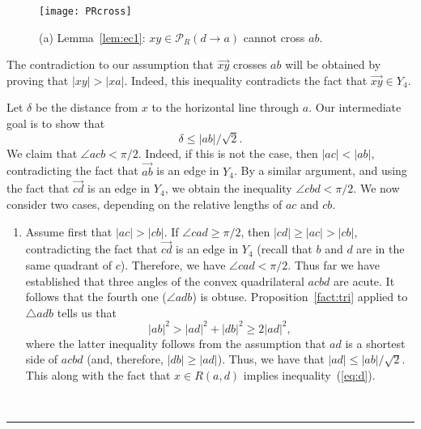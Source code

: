 \pdfoutput=1  \documentclass[11pt]{article}
\newcommand{\qed}{\rule{0.5em}{1.5ex}}
\newcommand{\fqed}{{\hfill~\qed}}
\newenvironment{proof}{{\noindent \bf Proof.}}
                      {{\hfill \fqed} \vspace{1em}}
\newcommand{\Pa}{{\mathcal P}}
\begin{document}
\begin{proof}
\begin{figure}[htbp]
\centering
\texttt{[image: PRcross]}
\caption{(a) Lemma~\ref{lem:ec1}: $xy \in \Pa_R(d \rightarrow a)$ cannot cross $ab$.}
\label{fig:PRcross}
\end{figure}


The contradiction to our assumption that $\overrightarrow{xy}$ crosses $ab$
will be obtained by proving that $|xy| > |xa|$. Indeed, this inequality
contradicts the fact that $\overrightarrow{xy} \in Y_4$.

Let $\delta$ be the distance from $x$ to the horizontal line through $a$.
Our intermediate goal is to show that
\begin{equation}
\delta \le |ab|/\sqrt{2} .
\label{eq:d}
\end{equation}
We claim that $\angle{acb} < \pi/2$. Indeed, if this is not the case,
then $|ac|<|ab|$, contradicting the fact that $\overrightarrow{ab}$ is an
edge in $Y_4$. By a similar argument, and using the fact that
$\overrightarrow{cd}$ is an edge in $Y_4$, we obtain the inequality
$\angle{cbd} < \pi/2$.
We now consider two cases, depending on the relative lengths of $ac$ and $cb$.

\begin{enumerate}

\item

Assume first that $|ac| > |cb|$.
If $\angle{cad} \geq \pi/2$, then $|cd| \geq |ac| > |cb|$, contradicting
the fact that $\overrightarrow{cd}$ is an edge in $Y_4$ (recall that $b$
and $d$ are in the same quadrant of $c$). Therefore, we have
$\angle{cad} < \pi/2$.
Thus far we have established that three angles of the convex quadrilateral
$acbd$ are acute. It follows that the fourth one ($\angle{adb}$) is obtuse.
Proposition~\ref{fact:tri}
applied to $\triangle adb$ tells us that
\begin{equation*}
 |ab|^2  >  |ad|^2 + |db|^2 \geq 2|ad|^2 ,
\end{equation*}
where the latter inequality follows from the assumption that $ad$ is a
shortest side of $acbd$ (and, therefore, $|db| \geq |ad|$).
Thus, we have that $|ad| \le |ab|/\sqrt{2}$. This along with the fact that
$x \in R(a, d)$ implies inequality~(\ref{eq:d}).


\end{enumerate}
\end{proof}
\end{document}
